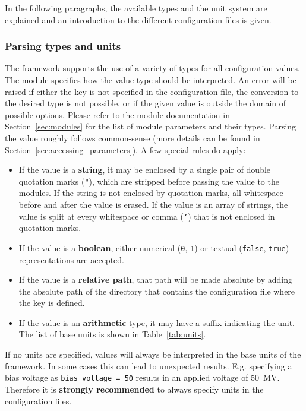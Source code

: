 In the following paragraphs, the available types and the unit system are explained and an introduction to the different configuration files is given.

\subsubsection{Parsing types and units}
\label{sec:config_values}
The \apsq framework supports the use of a variety of types for all configuration values.
The module specifies how the value type should be interpreted.
An error will be raised if either the key is not specified in the configuration file, the conversion to the desired type is not possible, or if the given value is outside the domain of possible options.
Please refer to the module documentation in Section~\ref{sec:modules} for the list of module parameters and their types.
Parsing the value roughly follows common-sense (more details can be found in Section~\ref{sec:accessing_parameters}).
A few special rules do apply:
\begin{itemize}
\item If the value is a \textbf{string}, it may be enclosed by a single pair of double quotation marks (\texttt{"}), which are stripped before passing the value to the modules.
If the string is not enclosed by quotation marks, all whitespace before and after the value is erased.
If the value is an array of strings, the value is split at every whitespace or comma (\texttt{'}) that is not enclosed in quotation marks.
\item If the value is a \textbf{boolean}, either numerical (\texttt{0}, \texttt{1}) or textual (\texttt{false}, \texttt{true}) representations are accepted.
\item If the value is a \textbf{relative path}, that path will be made absolute by adding the absolute path of the directory that contains the configuration file where the key is defined.
\item If the value is an \textbf{arithmetic} type, it may have a suffix indicating the unit.
The list of base units is shown in Table~\ref{tab:units}.
\end{itemize}

\begin{warning}
  If no units are specified, values will always be interpreted in the base units of the framework.
  In some cases this can lead to unexpected results.
  E.g. specifying a bias voltage as \texttt{bias\_voltage = 50} results in an applied voltage of \SI{50}{\mega\volt}.
  Therefore it is \textbf{strongly recommended} to always specify units in the configuration files.
\end{warning}

